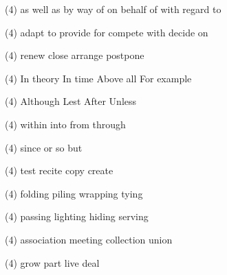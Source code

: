 \item
\begin{tasks}(4)
	\task as well as
	\task by way of
	\task on behalf of
	\task with regard to
\end{tasks}
\item
\begin{tasks}(4)
	\task adapt to
	\task provide for
	\task compete with
	\task decide on
\end{tasks}
\item
\begin{tasks}(4)
	\task renew
	\task close
	\task arrange
	\task postpone
\end{tasks}
\item
\begin{tasks}(4)
	\task In theory
	\task In time
	\task Above all
	\task For example
\end{tasks}
\item
\begin{tasks}(4)
	\task Although
	\task Lest
	\task After
	\task Unless
\end{tasks}
\item
\begin{tasks}(4)
	\task within
	\task into
	\task from
	\task through
\end{tasks}
\item
\begin{tasks}(4)
	\task since
	\task or
	\task so
	\task but
\end{tasks}
\item
\begin{tasks}(4)
	\task test
	\task recite
	\task copy
	\task create
\end{tasks}
\item
\begin{tasks}(4)
	\task folding
	\task piling
	\task wrapping
	\task tying
\end{tasks}
\item
\begin{tasks}(4)
	\task passing
	\task lighting
	\task hiding
	\task serving
\end{tasks}
\item
\begin{tasks}(4)
	\task association
	\task meeting
	\task collection
	\task union
\end{tasks}
\item
\begin{tasks}(4)
	\task grow
	\task part
	\task live
	\task deal
\end{tasks}
\item
